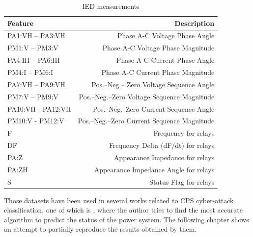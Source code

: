 \begin{table}[H]
    \centering
    \caption[IED measurements]{IED measurements \cite{adhikari_power_2014}} \label{tab:pmu_mes}
    \begin{tabular}{lr}
        \toprule
        Feature&Description \\
        \midrule
        PA1:VH – PA3:VH&Phase A-C Voltage Phase Angle \\
        PM1:V – PM3:V&Phase A-C Voltage Phase Magnitude \\
        PA4:IH – PA6:IH&Phase A-C Current Phase Angle \\
        PM4:I – PM6:I&Phase A-C Current Phase Magnitude \\
        PA7:VH – PA9:VH&Pos.–Neg.– Zero Voltage Sequence Angle \\
        PM7:V – PM9:V&Pos.–Neg.–Zero Voltage Sequence Magnitude \\
        PA10:VH - PA12:VH&Pos.–Neg.–Zero Current Sequence Angle \\
        PM10:V - PM12:V&Pos.–Neg.–Zero Current Sequence Magnitude \\
        F&Frequency for relays \\
        DF&Frequency Delta (dF/dt) for relays \\
        PA:Z&Appearance Impedance for relays \\
        PA:ZH&Appearance Impedance Angle for relays \\
        S&Status Flag for relays \\
        \bottomrule
    \end{tabular}
\end{table} 

Those datasets have been used in several works related to CPS cyber-attack classification, one of which is \cite{borges_hink_machine_2014-1}, where the author tries to find the most accurate algorithm to predict the status of the power system. The following chapter shows an attempt to partially reproduce the results obtained by them.



